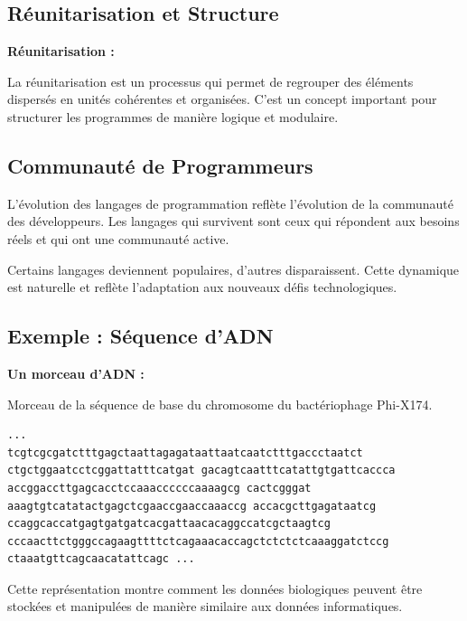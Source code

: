\documentclass[12pt,a4paper]{article}
\begin{document}
\subsection{Réunitarisation et Structure}

\begin{notecours}
\textbf{Réunitarisation :}

La réunitarisation est un processus qui permet de regrouper des éléments dispersés en unités cohérentes et organisées. C'est un concept important pour structurer les programmes de manière logique et modulaire.
\end{notecours}

\subsection{Communauté de Programmeurs}

\begin{astuce}
L'évolution des langages de programmation reflète l'évolution de la communauté des développeurs. Les langages qui survivent sont ceux qui répondent aux besoins réels et qui ont une communauté active. 

Certains langages deviennent populaires, d'autres disparaissent.  Cette dynamique est naturelle et reflète l'adaptation aux nouveaux défis technologiques.
\end{astuce}

\subsection{Exemple :  Séquence d'ADN}

\begin{exemple}
\textbf{Un morceau d'ADN :}

Morceau de la séquence de base du chromosome du bactériophage Phi-X174. 

\begin{verbatim}
... 
tcgtcgcgatctttgagctaattagagataattaatcaatctttgaccctaatct
ctgctggaatcctcggattatttcatgat gacagtcaatttcatattgtgattcaccca
accggaccttgagcacctccaaaccccccaaaagcg cactcgggat
aaagtgtcatatactgagctcgaaccgaaccaaaccg accacgcttgagataatcg
ccaggcaccatgagtgatgatcacgattaacacaggccatcgctaagtcg
cccaacttctgggccagaagttttctcagaaacaccagctctctctcaaaggatctccg
ctaaatgttcagcaacatattcagc ... 
\end{verbatim}

Cette représentation montre comment les données biologiques peuvent être stockées et manipulées de manière similaire aux données informatiques. 
\end{exemple}
\end{document}
